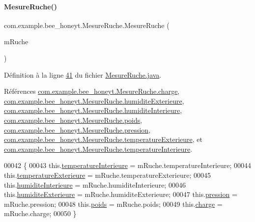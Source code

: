 \paragraph{\texorpdfstring{Mesure\+Ruche()}{MesureRuche()}\hspace{0.1cm}{\footnotesize\ttfamily [3/3]}}
{\footnotesize\ttfamily com.\+example.\+bee\+\_\+honeyt.\+Mesure\+Ruche.\+Mesure\+Ruche (\begin{DoxyParamCaption}\item[{\hyperlink{classcom_1_1example_1_1bee__honeyt_1_1_mesure_ruche}{Mesure\+Ruche}}]{m\+Ruche }\end{DoxyParamCaption})}



Définition à la ligne \hyperlink{_mesure_ruche_8java_source_l00041}{41} du fichier \hyperlink{_mesure_ruche_8java_source}{Mesure\+Ruche.\+java}.



Références \hyperlink{_mesure_ruche_8java_source_l00023}{com.\+example.\+bee\+\_\+honeyt.\+Mesure\+Ruche.\+charge}, \hyperlink{_mesure_ruche_8java_source_l00020}{com.\+example.\+bee\+\_\+honeyt.\+Mesure\+Ruche.\+humidite\+Exterieure}, \hyperlink{_mesure_ruche_8java_source_l00019}{com.\+example.\+bee\+\_\+honeyt.\+Mesure\+Ruche.\+humidite\+Interieure}, \hyperlink{_mesure_ruche_8java_source_l00022}{com.\+example.\+bee\+\_\+honeyt.\+Mesure\+Ruche.\+poids}, \hyperlink{_mesure_ruche_8java_source_l00021}{com.\+example.\+bee\+\_\+honeyt.\+Mesure\+Ruche.\+pression}, \hyperlink{_mesure_ruche_8java_source_l00018}{com.\+example.\+bee\+\_\+honeyt.\+Mesure\+Ruche.\+temperature\+Exterieure}, et \hyperlink{_mesure_ruche_8java_source_l00017}{com.\+example.\+bee\+\_\+honeyt.\+Mesure\+Ruche.\+temperature\+Interieure}.


\begin{DoxyCode}
00042     \{
00043         this.\hyperlink{classcom_1_1example_1_1bee__honeyt_1_1_mesure_ruche_afd0ecabb4e519d5bcfee33ac15b8b742}{temperatureInterieure} = mRuche.temperatureInterieure;
00044         this.\hyperlink{classcom_1_1example_1_1bee__honeyt_1_1_mesure_ruche_ac13ff0ed6c96cf755097510acf202521}{temperatureExterieure} = mRuche.temperatureExterieure;
00045         this.\hyperlink{classcom_1_1example_1_1bee__honeyt_1_1_mesure_ruche_a3b5d2536649e0acaf1eebeba4409c9bb}{humiditeInterieure} = mRuche.humiditeInterieure;
00046         this.\hyperlink{classcom_1_1example_1_1bee__honeyt_1_1_mesure_ruche_aa5521e97dfa98051bff9fd8d3ca3f34d}{humiditeExterieure} = mRuche.humiditeExterieure;
00047         this.\hyperlink{classcom_1_1example_1_1bee__honeyt_1_1_mesure_ruche_ae78080a6d5745faa411e3cfbdbf8aeec}{pression} = mRuche.pression;
00048         this.\hyperlink{classcom_1_1example_1_1bee__honeyt_1_1_mesure_ruche_a9aa6c575b7b69c4fb3825944e1f50722}{poids} = mRuche.poids;
00049         this.\hyperlink{classcom_1_1example_1_1bee__honeyt_1_1_mesure_ruche_a5ac02bc1d6195faa400e5a3171eed3f4}{charge} = mRuche.charge;
00050     \}
\end{DoxyCode}


